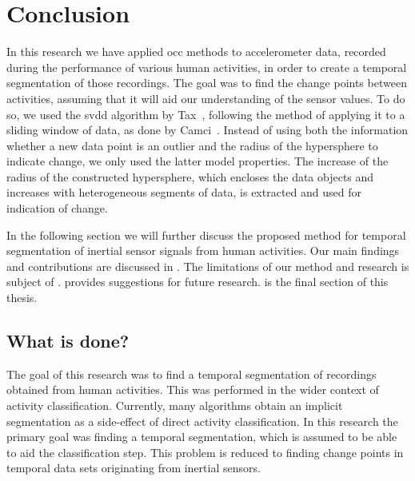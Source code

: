 
\chapter{Conclusion}

\label{Chapter7} %


In this research we have applied \gls{occ} methods to accelerometer data, recorded during the performance of various human activities, in order to create a temporal segmentation of those recordings.
The goal was to find the change points between activities, assuming that it will aid our understanding of the sensor values.
To do so, we used the \gls{svdd} algorithm by Tax~\cite{tax1999support}, following the method of applying it to a sliding window of data, as done by Camci~\cite{camci2010change}.
Instead of using both the information whether a new data point is an outlier and the radius of the hypersphere to indicate change, we only used the latter model properties.
The increase of the radius of the constructed hypersphere, which encloses the data objects and increases with heterogeneous segments of data, is extracted and used for indication of change.

In the following section we will further discuss the proposed method for temporal segmentation of inertial sensor signals from human activities.
Our main findings and contributions are discussed in .
The limitations of our method and research is subject of .
 provides suggestions for future research.
 is the final section of this thesis.

\section{What is done?}
The goal of this research was to find a temporal segmentation of recordings obtained from human activities.
This was performed in the wider context of activity classification.
Currently, many algorithms obtain an implicit segmentation as a side-effect of direct activity classification.
In this research the primary goal was finding a temporal segmentation, which is assumed to be able to aid the classification step.
This problem is reduced to finding change points in temporal data sets originating from inertial sensors.

